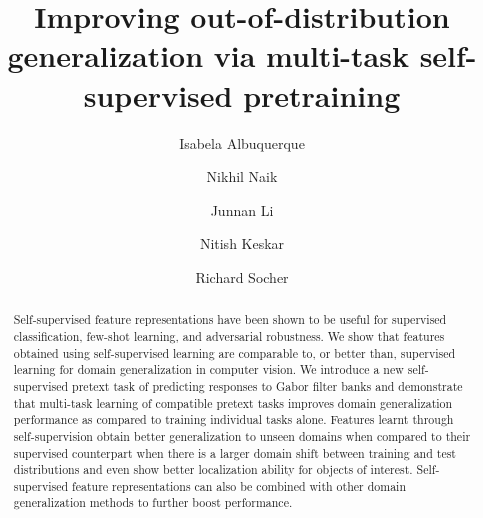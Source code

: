 \documentclass[runningheads]{llncs}
\begin{document}
\pagestyle{headings}
\mainmatter

\title{Improving out-of-distribution generalization via multi-task self-supervised pretraining} 

\author{Isabela Albuquerque \and
Nikhil Naik \and
Junnan Li \and Nitish Keskar \and Richard Socher}

\maketitle

\begin{abstract}
Self-supervised feature representations have been shown to be useful for supervised classification, few-shot learning, and adversarial robustness. We show that features obtained using self-supervised learning are comparable to, or better than, supervised learning for domain generalization in computer vision. We introduce a new self-supervised pretext task of predicting responses to Gabor filter banks and demonstrate that multi-task learning of compatible pretext tasks improves domain generalization performance as compared to training individual tasks alone. Features learnt through self-supervision obtain better generalization to unseen domains when compared to their supervised counterpart when there is a larger domain shift between training and test distributions and even show better localization ability for objects of interest. Self-supervised feature representations can also be combined with other domain generalization methods to further boost performance. 

\end{abstract}
\end{document}
